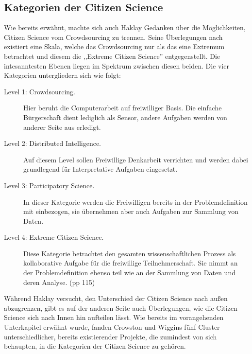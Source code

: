 \documentclass{article}
\begin{document}
\subsection{Kategorien der Citizen Science}
Wie bereits erwähnt, machte sich auch Haklay Gedanken über die Möglichkeiten, Citizen Science vom Crowdsourcing zu trennen.
Seine Überlegungen nach existiert eine Skala, welche das Crowdsourcing nur als das eine Extremum betrachtet und diesem die ,,Extreme Citizen Science'' entgegenstellt.
Die intesanntesten Ebenen liegen im Spektrum zwischen diesen beiden. Die vier Kategorien untergliedern sich wie folgt:

\begin{description}
\item[Level 1: Crowdsourcing.]
Hier beruht die Computerarbeit auf freiwilliger Basis.
Die einfache Bürgerschaft dient lediglich als Sensor, andere Aufgaben werden von anderer Seite aus erledigt.
\item[Level 2: Distributed Intelligence.]
Auf diesem Level sollen Freiwillige Denkarbeit verrichten und werden dabei grundlegend für Interpretative Aufgaben eingesetzt.
\item[Level 3: Participatory Science.]
In dieser Kategorie werden die Freiwilligen bereits in der Problemdefinition mit einbezogen, sie übernehmen aber auch Aufgaben zur Sammlung von Daten.
\item[Level 4: Extreme Citizen Science.]
Diese Kategorie betrachtet den gesamten wissenschaftlichen Prozess als kollaborative Aufgabe für die freiwillige Teilnehmerschaft.
Sie nimmt an der Problemdefinition ebenso teil wie an der Sammlung von Daten und deren Analyse.\cite{Haklay} (pp 115)
\end{description}

Während Haklay versucht, den Unterschied der Citizen Science nach außen abzugrenzen, gibt es auf der anderen Seite auch Überlegungen,
wie die Citizen Science sich nach Innen hin aufteilen lässt. Wie bereits im vorangehenden Unterkapitel erwähnt wurde,
fanden Crowston und Wiggins fünf Cluster unterschiedlicher, bereits existierender Projekte, die zumindest von sich behaupten,
in die Kategorien der Citizen Science zu gehören.
\end{document}
